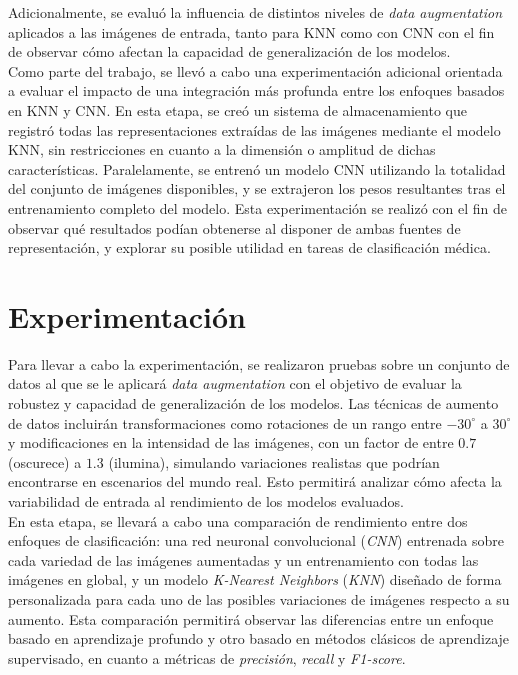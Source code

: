 \documentclass[12pt]{article} %
\begin{document}
Adicionalmente, se evaluó la influencia de distintos niveles de \textit{data augmentation} aplicados a las imágenes de entrada, tanto para KNN como con CNN con el fin de observar cómo afectan la capacidad de generalización de los modelos.\\

Como parte del trabajo, se llevó a cabo una experimentación adicional orientada a evaluar el impacto de una integración más profunda entre los enfoques basados en KNN y CNN. En esta etapa, se creó un sistema de almacenamiento que registró todas las representaciones extraídas de las imágenes mediante el modelo KNN, sin restricciones en cuanto a la dimensión o amplitud de dichas características. Paralelamente, se entrenó un modelo CNN utilizando la totalidad del conjunto de imágenes disponibles, y se extrajeron los pesos resultantes tras el entrenamiento completo del modelo. Esta experimentación se realizó con el fin de observar qué resultados podían obtenerse al disponer de ambas fuentes de representación, y explorar su posible utilidad en tareas de clasificación médica. 

 

\section{Experimentación}
Para llevar a cabo la experimentación, se realizaron pruebas sobre un conjunto de datos al que se le aplicará \textit{data augmentation} con el objetivo de evaluar la robustez y capacidad de generalización de los modelos. Las técnicas de aumento de datos incluirán transformaciones como rotaciones de un rango entre $-30^\circ$ a $30^\circ$ y modificaciones en la intensidad de las imágenes, con un factor de entre $0.7$ (oscurece) a $1.3$ (ilumina), simulando variaciones realistas que podrían encontrarse en escenarios del mundo real. Esto permitirá analizar cómo afecta la variabilidad de entrada al rendimiento de los modelos evaluados. \\

En esta etapa, se llevará a cabo una comparación de rendimiento entre dos enfoques de clasificación: una red neuronal convolucional (\textit{CNN}) entrenada sobre cada variedad de las imágenes aumentadas y un entrenamiento con todas las imágenes en global, y un modelo \textit{K-Nearest Neighbors} (\textit{KNN}) diseñado de forma personalizada para cada uno de las posibles variaciones de imágenes respecto a su aumento. Esta comparación permitirá observar las diferencias entre un enfoque basado en aprendizaje profundo y otro basado en métodos clásicos de aprendizaje supervisado, en cuanto a métricas de \textit{precisión}, \textit{recall} y \textit{F1-score}.
\end{document}

